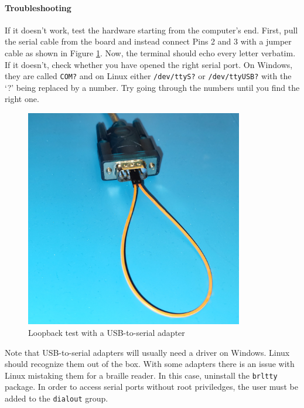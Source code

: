 \documentclass{article}
\newcommand{\file}[1]{\texttt{#1}}
\begin{document}
\paragraph{Troubleshooting}
If it doesn't work, test the hardware starting from the computer's end. First, pull the serial cable from the board and instead connect Pins 2 and 3 with a jumper cable as shown in Figure \ref{fig:serialLoopback}. Now, the terminal should echo every letter verbatim. If it doesn't, check whether you have opened the right serial port. On Windows, they are called \texttt{COM?} and on Linux either \file{/dev/ttyS?} or \file{/dev/ttyUSB?} with the `?' being replaced by a number. Try going through the numbers until you find the right one. 

\begin{figure}[htb]
\centering
\includegraphics[width=0.85\textwidth]{Pictures/SerialLoopback.jpg}
\caption{Loopback test with a USB-to-serial adapter}
\label{fig:serialLoopback}
\end{figure}

Note that USB-to-serial adapters will usually need a driver on Windows. Linux should recognize them out of the box. With some adapters there is an issue with Linux mistaking them for a braille reader. In this case, uninstall the \texttt{brltty} package. In order to access serial ports without root priviledges, the user must be added to the \texttt{dialout} group. 
\end{document}
